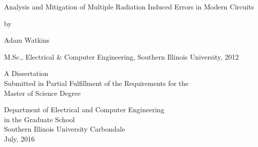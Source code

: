 \begin{center}


Analysis and Mitigation of Multiple Radiation Induced Errors in Modern Circuits

\vskip 1.8in

by

Adam Watkins

M.Sc., Electrical \& Computer Engineering, Southern Illinois University, 2012

\vskip 2in

\vbox{\baselineskip=14pt
A Dissertation \\
Submitted in Partial Fulfillment of the Requirements for the \\
Master of Science Degree
}

\vskip 2in


\vbox{\baselineskip=14pt
Department of Electrical and Computer Engineering \\
in the Graduate School \\
Southern Illinois University Carbondale \\
July, 2016
}

\end{center}
